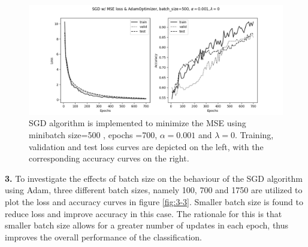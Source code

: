 \documentclass[12pt]{article}
\newenvironment{problem}[2][Problem]{\begin{trivlist}
\item[\hskip \labelsep {\bfseries #1}\hskip \labelsep {\bfseries #2.}]}{\end{trivlist}}
\begin{document}
\begin{problem}{3}
\begin{figure}[!htb]
 \hspace*{-2cm}\includegraphics[width=1.2\linewidth]{images/a1/3.2/sgd_loss_accuracy.png}
\caption{SGD algorithm is implemented to minimize the MSE using minibatch size=500 , epochs =700, $\alpha=0.001$ and $\lambda=0$. Training, validation and test loss curves are depicted on the left, with the corresponding accuracy curves on the right.}\label{fig:3-2}
\end{figure}


\bigskip
\newpage
\textbf{3. } To investigate the effects of batch size on the behaviour of the SGD algorithm using Adam, three different batch sizes, namely 100, 700 and 1750 are utilized to plot the loss and accuracy curves in figure \ref{fig:3-3}. Smaller batch size is found to reduce loss and improve accuracy in this case. The rationale for this is that smaller batch size allows for a greater number of updates in each epoch, thus improves the overall performance of the classification.   


\end{problem}
\end{document}
